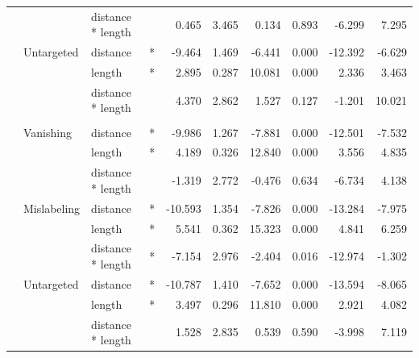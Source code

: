 \documentclass[
]{article}
\begin{document}
\begin{longtable}[t]{llllrrrrrr}
\cmidrule{3-10}\nopagebreak
\hspace{1em} &  & distance * length &  & 0.465 & 3.465 & 0.134 & 0.893 & -6.299 & 7.295\\
\cmidrule{2-10}\nopagebreak
\hspace{1em} & Untargeted & distance & * & -9.464 & 1.469 & -6.441 & 0.000 & -12.392 & -6.629\\
\cmidrule{3-10}\nopagebreak
\hspace{1em} &  & length & * & 2.895 & 0.287 & 10.081 & 0.000 & 2.336 & 3.463\\
\cmidrule{3-10}\nopagebreak
\hspace{1em} &  & distance * length &  & 4.370 & 2.862 & 1.527 & 0.127 & -1.201 & 10.021\\
\cmidrule{1-10}\pagebreak[0]
\addlinespace[0.3em]
\multicolumn{10}{l}{\textbf{SSD}}\\
\hspace{1em} & Vanishing & distance & * & -9.986 & 1.267 & -7.881 & 0.000 & -12.501 & -7.532\\
\cmidrule{3-10}\nopagebreak
\hspace{1em} &  & length & * & 4.189 & 0.326 & 12.840 & 0.000 & 3.556 & 4.835\\
\cmidrule{3-10}\nopagebreak
\hspace{1em} &  & distance * length &  & -1.319 & 2.772 & -0.476 & 0.634 & -6.734 & 4.138\\
\cmidrule{2-10}\nopagebreak
\hspace{1em} & Mislabeling & distance & * & -10.593 & 1.354 & -7.826 & 0.000 & -13.284 & -7.975\\
\cmidrule{3-10}\nopagebreak
\hspace{1em} &  & length & * & 5.541 & 0.362 & 15.323 & 0.000 & 4.841 & 6.259\\
\cmidrule{3-10}\nopagebreak
\hspace{1em} &  & distance * length & * & -7.154 & 2.976 & -2.404 & 0.016 & -12.974 & -1.302\\
\cmidrule{2-10}\nopagebreak
\hspace{1em} & Untargeted & distance & * & -10.787 & 1.410 & -7.652 & 0.000 & -13.594 & -8.065\\
\cmidrule{3-10}\nopagebreak
\hspace{1em} &  & length & * & 3.497 & 0.296 & 11.810 & 0.000 & 2.921 & 4.082\\
\cmidrule{3-10}\nopagebreak
\hspace{1em} &  & distance * length &  & 1.528 & 2.835 & 0.539 & 0.590 & -3.998 & 7.119\\

\end{longtable}
\end{document}
